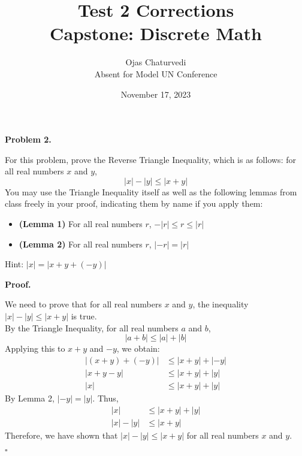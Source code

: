 \documentclass{article}
\title{Test 2 Corrections \\ \large Capstone: Discrete Math}
\author{Ojas Chaturvedi \\ \small Absent for Model UN Conference}
\date{November 17, 2023}
\newenvironment{problem}[1]{
    \begin{mdframed}[backgroundcolor=gray!20, skipabove=\baselineskip, skipbelow=\baselineskip, nobreak=true, innerleftmargin=10pt, innerrightmargin=10pt, innertopmargin=10pt, innerbottommargin=10pt]
    \textbf{Problem #1.}
}{
    \end{mdframed}
}
\newenvironment{proof}{
    \begin{mdframed}[nobreak=true, innerleftmargin=10pt, innerrightmargin=10pt, innertopmargin=10pt, innerbottommargin=10pt]
    \textbf{Proof.}
}{
    \hfill $\square$
    \end{mdframed}
}
\begin{document}
\begin{titlingpage}
    \maketitle
\end{titlingpage}


\begin{problem}{2}
    For this problem, prove the Reverse Triangle Inequality, which is as follows: for all real numbers $x$ and $y$,
    \begin{equation*}
        |x| - |y| \leq |x + y|
    \end{equation*}
    You may use the Triangle Inequality itself as well as the following lemmas from class freely in your proof, indicating them by name if you apply them:
    \begin{itemize}
        \item \textbf{(Lemma 1)} For all real numbers $r$, $- |r| \leq r \leq |r|$
        \item \textbf{(Lemma 2)} For all real numbers $r$, $|-r| = |r|$
    \end{itemize}
    Hint: $|x| = |x + y + (-y)|$
\end{problem}
\begin{proof}
    We need to prove that for all real numbers $x$ and $y$, the inequality $|x| - |y| \leq |x + y|$ is true. \\
    By the Triangle Inequality, for all real numbers $a$ and $b$,
    \begin{equation*}
        |a + b| \leq |a| + |b|
    \end{equation*}
    Applying this to $x + y$ and $-y$, we obtain:
    \begin{align*}
        |(x + y) + (-y)| &\leq |x + y| + |-y| \\
        |x + y - y| &\leq |x + y| + |y| \\
        |x| &\leq |x + y| + |y| 
    \end{align*}
    By Lemma 2, $|-y| = |y|$. Thus,
    \begin{align*}
        |x| &\leq |x + y| + |y| \\
        |x| - |y| &\leq |x + y|
    \end{align*}
    Therefore, we have shown that $|x| - |y| \leq |x + y|$ for all real numbers $x$ and $y$.
\end{proof}
\end{document}
